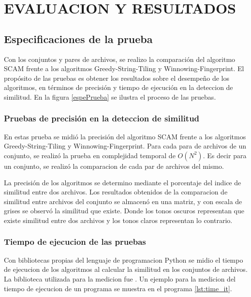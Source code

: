 \chapter{EVALUACION Y RESULTADOS}
\section{Especificaciones de la prueba}
Con los conjuntos y pares de archivos, se realizo la comparación del algoritmo SCAM frente a los algoritmos Greedy-String-Tiling y Winnowing-Fingerprint. El propósito de las pruebas es obtener los resultados sobre el desempeño de los algoritmos, en términos de precisión y tiempo de ejecución en la deteccion de similitud. En la figura \ref{espePrueba} se ilustra el proceso de las pruebas.



\subsection{Pruebas de precisión en la deteccion de similitud}
En estas prueba se midió la precisión del algoritmo SCAM frente a los algoritmos Greedy-String-Tiling y Winnowing-Fingerprint. Para cada para de archivos de un conjunto, se realizó la prueba en complejidad temporal de $O(N^2)$. Es decir para un conjunto, se realizó la comparacion de cada par de archivos del mismo.

La precisión de los algoritmos se determino mediante el porcentaje del indice de similitud entre dos archivos. Los resultados obtenidos de la comparacion de similitud entre archivos del conjunto se almacenó en una matriz, y con escala de grises se observó la similitud que existe. Donde los tonos oscuros representan que existe similitud entre dos archivos y los tonos claros representan lo contrario.

\subsection{Tiempo de ejecucion de las pruebas}
Con bibliotecas propias del lenguaje de programacion Python se midio el tiempo de ejecucion de los algoritmos al calcular la similitud en los conjuntos de archivos. La biblioteca utilizada para la medicion fue . Un ejemplo para la medicion del tiempo de ejecucion de un programa se muestra en el programa \ref{lst:time_it}.



